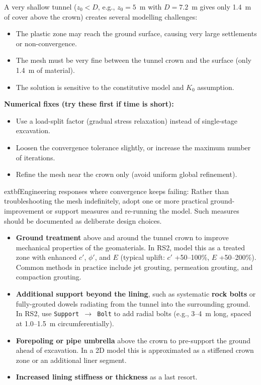 \begin{warnbox}
A very shallow tunnel ($z_0 < D$, e.g., $z_0 = 5$~m with $D = 7.2$~m gives only 1.4~m of cover above the crown) creates several modelling challenges:
\begin{itemize}[nosep]
 \item The plastic zone may reach the ground surface, causing very large settlements or non-convergence.
 \item The mesh must be very fine between the tunnel crown and the surface (only 1.4~m of material).
 \item The solution is sensitive to the constitutive model and $K_0$ assumption.
\end{itemize}
\vspace{0.5em}

\textbf{Numerical fixes (try these first if time is short):}
\begin{itemize}[nosep]
 \item Use a load-split factor (gradual stress relaxation) instead of single-stage excavation.
 \item Loosen the convergence tolerance slightly, or increase the maximum number of iterations.
 \item Refine the mesh near the crown only (avoid uniform global refinement).
\end{itemize}
\vspace{0.5em}

	extbf{Engineering responses where convergence keeps failing:}
Rather than troubleshooting the mesh indefinitely, adopt one or more practical ground-improvement or support measures and re-running the model. Such measures should be documented as deliberate design choices.
\begin{itemize}[nosep]
 \item \textbf{Ground treatment} above and around the tunnel crown to improve mechanical properties of the geomaterials. In RS2, model this as a treated zone with enhanced $c'$, $\phi'$, and $E$ (typical uplift: $c'$ +50--100\%, $E$ +50--200\%). Common methods in practice include jet grouting, permeation grouting, and compaction grouting.
 \item \textbf{Additional support beyond the lining}, such as systematic \textbf{rock bolts} or fully-grouted dowels radiating from the tunnel into the surrounding ground. In RS2, use \texttt{Support $\to$ Bolt} to add radial bolts (e.g., 3--4~m long, spaced at 1.0--1.5~m circumferentially).
 \item \textbf{Forepoling or pipe umbrella} above the crown to pre-support the ground ahead of excavation. In a 2D model this is approximated as a stiffened crown zone or an additional liner segment.
 \item \textbf{Increased lining stiffness or thickness} as a last resort.
\end{itemize}
\vspace{0.5em}


\end{warnbox}
